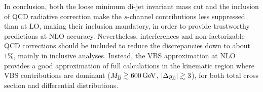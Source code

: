 In conclusion, both the loose minimum di-jet invariant mass cut and the inclusion of QCD radiative correction make the $s$-channel contributions less suppressed than at LO, making their inclusion mandatory, in order to provide trustworthy predictions at NLO accuracy.
Nevertheless, interferences and non-factorizable QCD corrections should be included to reduce the discrepancies down to about $1\%$, mainly in inclusive analyses.
Instead, the VBS approximation at NLO provides a good approximation of full calculations in the kinematic region where VBS contributions are dominant ($M_{\text{j}\text{j}} \gtrsim 600 \,\text{GeV}$, $|\Delta y_{\text{j}\text{j}}| \gtrsim 3$), for both total cross section and differential distributions.
